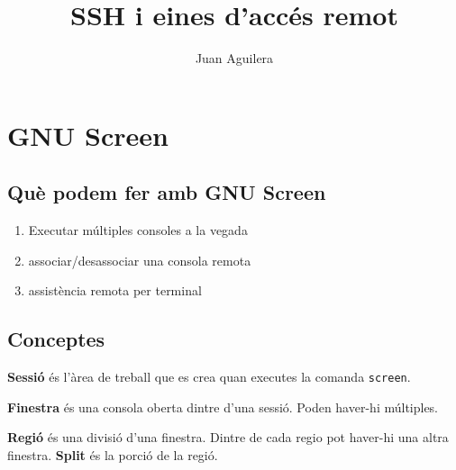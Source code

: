 \documentclass[a4paper]{article}
\begin{document}
\title{SSH i eines d'acc\'es remot}
\author{Juan Aguilera}
\maketitle



\section{GNU Screen}
\subsection{Què podem fer amb GNU Screen}

\begin{enumerate}
	\item Executar múltiples consoles a la vegada
	\item associar/desassociar una consola remota
	\item assistència remota per terminal
\end{enumerate}

\subsection{Conceptes}

\textbf{Sessió} \'es l'àrea de treball que es crea quan executes la comanda \verb+screen+.

\textbf{Finestra} \'es una consola oberta dintre d'una sessió. Poden haver-hi múltiples.

\textbf{Regió} \'es una divisió d'una finestra. Dintre de cada regio pot haver-hi una altra finestra. \textbf{Split} \'es la porció de la regió.
\end{document}
